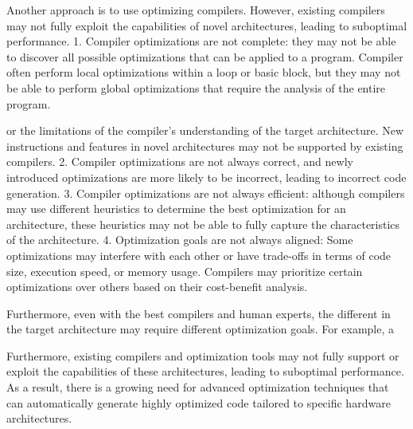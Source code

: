 Another approach is to use optimizing compilers. However, existing
compilers may not fully exploit the capabilities of novel
architectures, leading to suboptimal performance.
%
1. Compiler optimizations are not complete: they may not be able to
discover all possible optimizations that can be applied to a program.
Compiler often perform local optimizations within a loop or basic
block, but they may not be able to perform global optimizations that
require the analysis of the entire program.


or the limitations of the compiler's
understanding of the target architecture.
New instructions and features in novel architectures may not be
supported by existing compilers.
%
2. Compiler optimizations are not always correct, and newly introduced
optimizations are more likely to be incorrect, leading to incorrect
code generation.
%
3. Compiler optimizations are not always efficient: although compilers
may use different heuristics to determine the best optimization for an
architecture, these heuristics may not be able to fully capture the
characteristics of the architecture.
%
4. Optimization goals are not always aligned: Some
optimizations may interfere with each other or have trade-offs in
terms of code size, execution speed, or memory usage. Compilers may
prioritize certain optimizations over others based on their
cost-benefit analysis.

























Furthermore, even with the best compilers and human experts, the
different in the target architecture may require different
optimization goals. For example, a








Furthermore, existing compilers and optimization tools may not fully
support or exploit the capabilities of these architectures, leading to
suboptimal performance. As a result, there is a growing need for
advanced optimization techniques that can automatically generate
highly optimized code tailored to specific hardware architectures.

